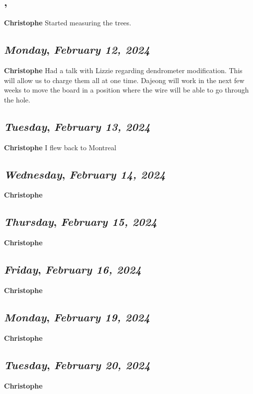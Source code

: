 \subsection*{\weekday, \day}
\textbf {Christophe}
Started measuring the trees. 

\def\day{\textit{February 12, 2024}}
\def\weekday{\textit{Monday}}
\subsection*{\weekday, \day}
\textbf {Christophe}
Had a talk with Lizzie regarding dendrometer modification. This will allow us to charge them all at one time. Dajeong will work in the next few weeks to move the board in a position where the wire will be able to go through the hole. 

\def\day{\textit{February 13, 2024}}
\def\weekday{\textit{Tuesday}}
\subsection*{\weekday, \day}
\textbf {Christophe}
I flew back to Montreal

\def\day{\textit{February 14, 2024}}
\def\weekday{\textit{Wednesday}}
\subsection*{\weekday, \day}
\textbf {Christophe}

\def\day{\textit{February 15, 2024}}
\def\weekday{\textit{Thursday}}
\subsection*{\weekday, \day}
\textbf {Christophe}

\def\day{\textit{February 16, 2024}}
\def\weekday{\textit{Friday}}
\subsection*{\weekday, \day}
\textbf {Christophe}

\def\day{\textit{February 19, 2024}}
\def\weekday{\textit{Monday}}
\subsection*{\weekday, \day}
\textbf {Christophe}

\def\day{\textit{February 20, 2024}}
\def\weekday{\textit{Tuesday}}
\subsection*{\weekday, \day}
\textbf {Christophe}

